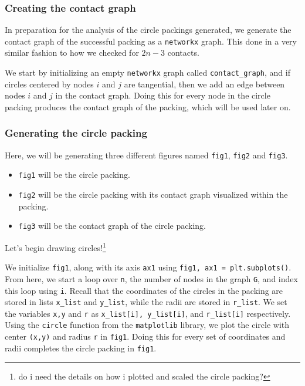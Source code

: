 \subsubsection{Creating the contact graph}

\begin{flushleft}
In preparation for the analysis of the circle packings generated, we generate the contact graph of the successful packing as a \texttt{networkx} graph. This done in a very similar fashion to how we checked for $2n-3$ contacts.
\end{flushleft}

\begin{flushleft}
We start by initializing an empty \texttt{networkx} graph called \texttt{contact\_graph}, and if circles centered by nodes $i$ and $j$ are tangential, then we add an edge between nodes $i$ and $j$ in the contact graph. Doing this for every node in the circle packing produces the contact graph of the packing, which will be used later on.
\end{flushleft}

\subsubsection{Generating the circle packing}

\begin{flushleft}
Here, we will be generating three different figures named \texttt{fig1}, \texttt{fig2} and \texttt{fig3}. 
\begin{itemize}
    \item \texttt{fig1} will be the circle packing.
    \vspace{-3mm}
    \item \texttt{fig2} will be the circle packing with its contact graph visualized within the packing.
    \vspace{-3mm}
    \item \texttt{fig3} will be the contact graph of the circle packing. 
\end{itemize}

Let's begin drawing circles!\footnote{do i need the details on how i plotted and scaled the circle packing?}
\end{flushleft}

\begin{flushleft}
We initialize \texttt{fig1}, along with its axis \texttt{ax1} using \texttt{fig1, ax1 = plt.subplots()}. From here, we start a loop over \texttt{n}, the number of nodes in the graph \texttt{G}, and index this loop using \texttt{i}. Recall that the coordinates of the circles in the packing are stored in lists \texttt{x\_list} and \texttt{y\_list}, while the radii are stored in \texttt{r\_list}. We set the variables \texttt{x,y} and \texttt{r} as \texttt{x\_list[i], y\_list[i]}, and  \texttt{r\_list[i]} respectively. Using the \texttt{circle} function from the \texttt{matplotlib} library, we plot the circle with center \texttt{(x,y)} and radius \texttt{r} in \texttt{fig1}. Doing this for every set of coordinates and radii completes the circle packing in \texttt{fig1}.
\end{flushleft} 

